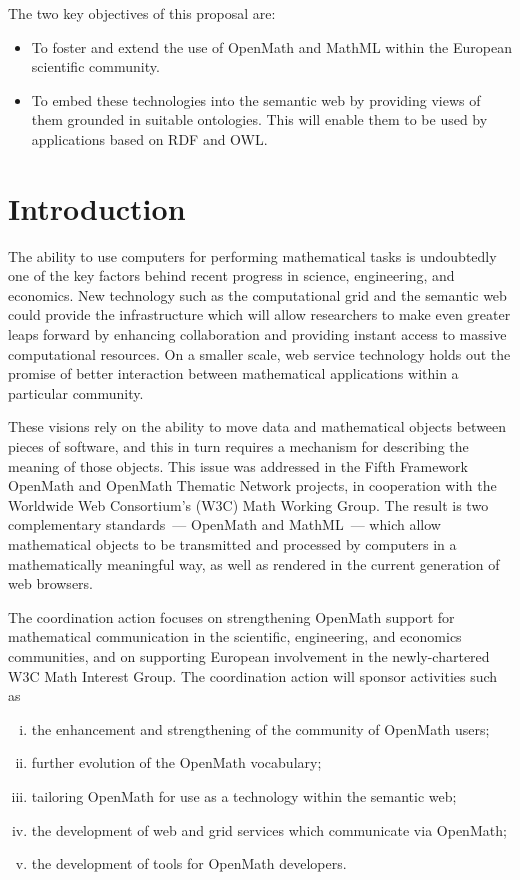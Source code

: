 \documentclass[draft]{artikel3}
\begin{document}
The two key objectives of this proposal are:
\begin{itemize}
\item To foster and extend the use of OpenMath and MathML within the
  European scientific community.
\item To embed these technologies into the semantic web by providing
  views of them grounded in suitable ontologies.  This will enable
  them to be used by applications based on RDF and OWL.
\end{itemize}


\section{Introduction}

The ability to use computers for performing mathematical tasks is
undoubtedly one of the key factors behind recent progress in science,
engineering, and economics.  New technology such as the computational
grid and the semantic web could provide the infrastructure which will
allow researchers to make even greater leaps forward by enhancing
collaboration and providing instant access to massive computational
resources.  On a smaller scale, web service technology holds out the
promise of better interaction between mathematical applications within
a particular community.

These visions rely on the ability to move data and mathematical
objects between pieces of software, and this in turn requires a
mechanism for describing the meaning of those objects.  This issue was
addressed in the Fifth Framework OpenMath and OpenMath Thematic
Network projects, in cooperation with the Worldwide Web Consortium's
(W3C) Math Working Group.  The result is two complementary
standards~--- OpenMath and MathML~--- which allow mathematical objects
to be transmitted and processed by computers in a mathematically
meaningful way, as well as rendered in the current generation of web
browsers.

The coordination action focuses on strengthening OpenMath support for
mathematical communication in the scientific, engineering, and
economics communities, and on supporting European involvement in the
newly-chartered W3C Math Interest Group.  The coordination action will
sponsor activities such as

\begin{enumerate}[(i)]
\item the enhancement and strengthening of the community of OpenMath
  users;
\item further evolution of the OpenMath vocabulary;
\item tailoring OpenMath for use as a technology within the semantic
  web;
\item the development of web and grid services which communicate via
  OpenMath;
\item the development of tools for OpenMath developers.
\end{enumerate}
\end{document}
